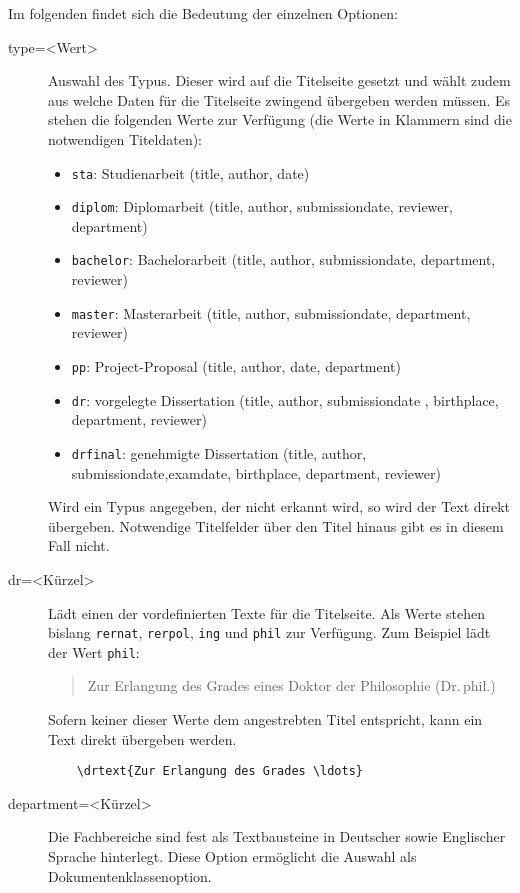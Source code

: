 \documentclass[
	german,%
	ruledheaders=section,%
	class=report,%
	thesis={type=bachelor},%
	fontsize=11pt,%
	parskip=half-,%
	custommargins=true,%
	marginpar=false,%
	accentcolor=9c,%
]{tudapub}
\let\code\texttt
\begin{document}
Im folgenden findet sich die Bedeutung der einzelnen Optionen:
\begin{description}
	\item[type=<Wert>] Auswahl des Typus.
	      Dieser wird auf die Titelseite gesetzt und wählt zudem aus welche Daten für die Titelseite zwingend übergeben werden müssen.
	      Es stehen die folgenden Werte zur Verfügung (die Werte in Klammern sind die notwendigen Titeldaten):
	      \begin{itemize}
		      \item \code{sta}: Studienarbeit (title, author, date)
		      \item \code{diplom}: Diplomarbeit (title, author, submissiondate, reviewer, department)
		      \item \code{bachelor}: Bachelorarbeit (title, author, submissiondate, department, reviewer)
		      \item \code{master}: Masterarbeit (title, author, submissiondate, department, reviewer)
		      \item \code{pp}: Project-Proposal  (title, author, date, department)
		      \item \code{dr}: vorgelegte Dissertation (title, author, submissiondate , birthplace, department, reviewer)
		      \item \code{drfinal}: genehmigte Dissertation (title, author, submissiondate,examdate, birthplace, department, reviewer)
	      \end{itemize}
	      Wird ein Typus angegeben, der nicht erkannt wird, so wird der Text direkt übergeben.
	      Notwendige Titelfelder über den Titel hinaus gibt es in diesem Fall nicht.
	\item[dr=<Kürzel>] Lädt einen der vordefinierten Texte für die Titelseite.
	      Als Werte stehen bislang \code{rernat}, \code{rerpol}, \code{ing} und \code{phil} zur Verfügung.
	      Zum Beispiel lädt der Wert \code{phil}:
	      \begin{quote}
		      Zur Erlangung des Grades eines Doktor der Philosophie (Dr.\,phil.)
	      \end{quote}
	      Sofern keiner dieser Werte dem angestrebten Titel entspricht, kann ein Text direkt übergeben werden.
\begin{verbatim}
    \drtext{Zur Erlangung des Grades \ldots}
\end{verbatim}
	\item[department=<Kürzel>] Die Fachbereiche sind fest als Textbausteine in Deutscher sowie Englischer Sprache hinterlegt.
	      Diese Option ermöglicht die Auswahl als Dokumentenklassenoption.

\end{description}
\end{document}

